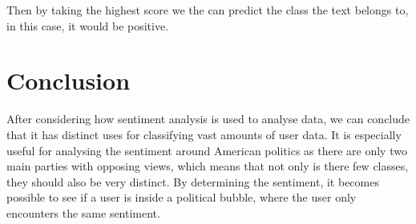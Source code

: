 Then by taking the highest score we the can predict the class the text belongs
to, in this case, it would be positive.

\section{Conclusion}\label{sec:DAConc}
After considering how sentiment analysis is used to analyse data, we can
conclude that it has distinct uses for classifying vast amounts of user data. It
is especially useful for analysing the sentiment around American politics as
there are only two main parties with opposing views, which means that not only
is there few classes, they should also be very distinct. By determining the
sentiment, it becomes possible to see if a user is inside a political bubble,
where the user only encounters the same sentiment.



